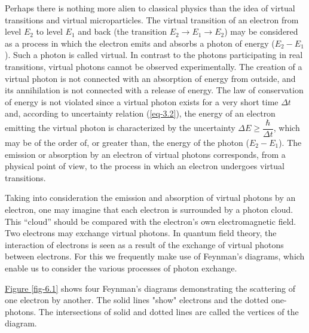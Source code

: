\documentclass[a4paper,sfsidenotes,colorlinks=true]{tufte-book}
\numberwithin{equation}{section}
\numberwithin{figure}{section}
\begin{document}
Perhaps 
there is nothing more alien to classical physics than the idea of
virtual transitions and virtual microparticles. The virtual transition
of an electron from level $E_{2}$ to level $E_{1}$ and back (the
transition $E_{2} \to E_{1} \to E_{2}$) may be considered as a process
in which the electron emits and absorbs a photon of energy ($E_{2} -
E_{1}$). Such a photon is called virtual. In contrast to the photons
participating in real transitions, virtual photons cannot be observed
experimentally. The creation of a virtual photon is not connected with
an absorption of energy from outside, and its annihilation is not
connected with a release of energy. The law of conservation of energy
is not violated since a virtual photon exists for a very short time
$\Delta t$ and, according to uncertainty relation (\ref{eq-3.2}), the
energy of an electron emitting the virtual photon is characterized by
the uncertainty $\Delta E \ge \dfrac{\hbar}{\Delta t}$, which may be
of the order of, or greater than, the energy of the photon ($E_{2} -
E_{1}$). The emission or absorption by an electron of virtual photons
corresponds, from a physical point of view, to the process in which an
electron undergoes virtual transitions.

Taking into consideration the emission and absorption of virtual
photons by an electron, one may imagine that each electron is
surrounded by a photon cloud. This ``cloud'' should be compared with the
electron's own electromagnetic field. Two electrons may exchange
virtual photons. In quantum field theory, the interaction of electrons
is seen as a result of the exchange of virtual photons between
electrons. For this we frequently make use of Feynman's diagrams,
which enable us to consider the various processes of photon exchange.

\hyperref[fig-6.1]{Figure \ref{fig-6.1}} shows four Feynman's
diagrams demonstrating the scattering of one electron by another. The
solid lines "show" electrons and the dotted one-photons. The
intersections of solid and dotted lines are called the vertices of the
diagram. 
\end{document}
